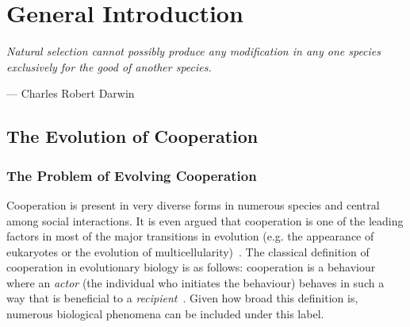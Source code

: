 \chapter{General Introduction}

\epigraph{\textit{Natural selection cannot possibly produce any modification in any one species exclusively for the good of another species.}}{--- \textup{Charles Robert Darwin}}

\minitoc[n] %


\section{The Evolution of Cooperation}

  \subsection{The Problem of Evolving Cooperation}

    Cooperation is present in very diverse forms in numerous species and central among social interactions. It is even argued that cooperation is one of the leading factors in most of the major transitions in evolution (e.g. the appearance of eukaryotes or the evolution of multicellularity)~\parencite{Szathmary1995}. The classical definition of cooperation in evolutionary biology is as follows: cooperation is a behaviour where an \emph{actor} (the individual who initiates the behaviour) behaves in such a way that is beneficial to a \emph{recipient}~\parencite{West2007a}. Given how broad this definition is, numerous biological phenomena can be included under this label. 

